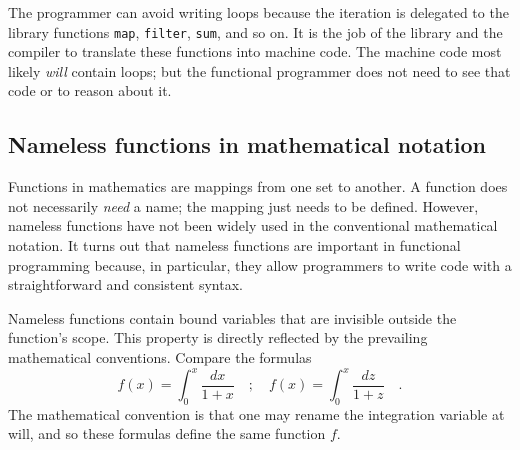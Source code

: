 The programmer can avoid writing loops because the iteration is delegated
to the library functions \lstinline!map!, \lstinline!filter!, \lstinline!sum!,
and so on. It is the job of the library and the compiler to translate
these functions into machine code. The machine code most likely \emph{will}
contain loops; but the functional programmer does not need to see
that code or to reason about it.

\subsection{Nameless functions in mathematical notation\label{subsec:Nameless-functions-in-mathematical-notation}}

Functions in mathematics are mappings from one set to another. A function
does not necessarily \emph{need} a name; the mapping just needs to
be defined. However, nameless functions have not been widely used
in the conventional mathematical notation. It turns out that nameless
functions are important in functional programming because, in particular,
they allow programmers to write code with a straightforward and consistent
syntax.

Nameless functions contain bound variables that are invisible outside
the function\textsf{'}s scope. This property is directly reflected by the prevailing
mathematical conventions. Compare the formulas
\[
f\left(x\right)=\int_{0}^{x}\frac{dx}{1+x}\quad;\quad f\left(x\right)=\int_{0}^{x}\frac{dz}{1+z}\quad.
\]
The mathematical convention is that one may rename the integration
variable at will, and so these formulas define the same function $f$.

